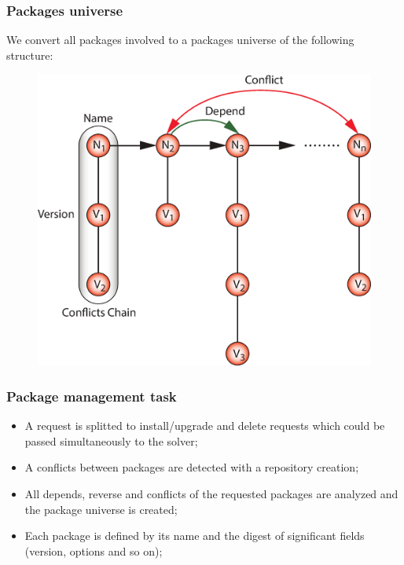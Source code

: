 \documentclass{beamer}
\begin{document}
\begin{frame}
\frametitle{Packages universe}
We convert all packages involved to a packages universe of the following
structure:
\begin{figure}[h!]
  \centering
  \includegraphics[height=0.7\textheight]{q5.eps}
\end{figure}
\end{frame}

\begin{frame}
\frametitle{Package management task}
\begin{itemize}
  \item A request is splitted to install/upgrade and delete requests which
  could be passed simultaneously to the solver;
  \item A conflicts between packages are detected with a repository creation;
  \item All depends, reverse and conflicts of the requested packages are
  analyzed and the package universe is created;
  \item Each package is defined by its name and the digest of significant
  fields (version, options and so on);
\end{itemize}
\end{frame}
\end{document}

